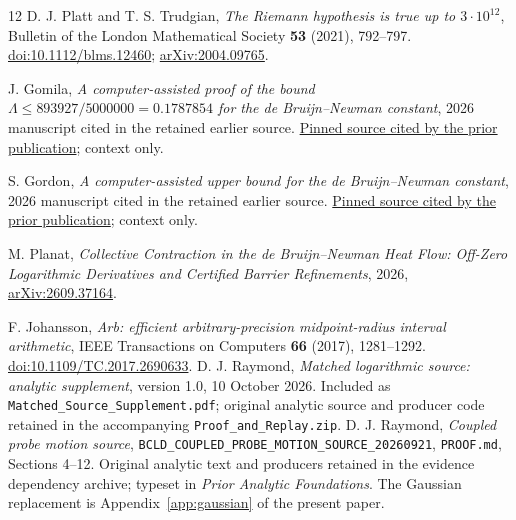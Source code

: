 \documentclass[11pt,a4paper]{article}
\theoremstyle{definition}\newtheorem{definition}[theorem]{Definition}
\theoremstyle{remark}\newtheorem{remark}[theorem]{Remark}
\begin{document}
\begin{thebibliography}{12}
 D. J. Platt and T. S. Trudgian,
\emph{The Riemann hypothesis is true up to $3\cdot10^{12}$},
Bulletin of the London Mathematical Society \textbf{53} (2021), 792--797.
\href{https://doi.org/10.1112/blms.12460}{doi:10.1112/blms.12460};
\href{https://arxiv.org/abs/2004.09765}{arXiv:2004.09765}.

 J. Gomila,
\emph{A computer-assisted proof of the bound
$\Lambda\le893927/5000000=0.1787854$ for the de Bruijn--Newman constant},
2026 manuscript cited in the retained earlier source.
\href{https://github.com/judegomila/dbn-lambda-01787854-candidate-audit/tree/a74738deb6d5e0f76887cb36901da08b68dca705}{Pinned source cited by the prior publication}; context only.

 S. Gordon,
\emph{A computer-assisted upper bound for the de Bruijn--Newman constant},
2026 manuscript cited in the retained earlier source.
\href{https://github.com/stefangordon/dbn-upper-bound/tree/64c47f2db67288beb62c24d7a0f7aedd645dc4b3}{Pinned source cited by the prior publication}; context only.

 M. Planat,
\emph{Collective Contraction in the de Bruijn--Newman Heat Flow:
Off-Zero Logarithmic Derivatives and Certified Barrier Refinements},
2026, \href{https://arxiv.org/abs/2609.37164}{arXiv:2609.37164}.

 F. Johansson,
\emph{Arb: efficient arbitrary-precision midpoint-radius interval arithmetic},
IEEE Transactions on Computers \textbf{66} (2017), 1281--1292.
\href{https://doi.org/10.1109/TC.2017.2690633}{doi:10.1109/TC.2017.2690633}.
 D. J. Raymond,
\emph{Matched logarithmic source: analytic supplement}, version 1.0,
10 October 2026. Included as \texttt{Matched\_Source\_Supplement.pdf};
original analytic source and producer code retained in the accompanying
\texttt{Proof\_and\_Replay.zip}.
 D. J. Raymond, \emph{Coupled probe motion source},
\nolinkurl{BCLD_COUPLED_PROBE_MOTION_SOURCE_20260921},
\texttt{PROOF.md}, Sections 4--12. Original analytic text and producers
retained in the evidence dependency archive; typeset in
\emph{Prior Analytic Foundations}. The Gaussian replacement is
Appendix~\ref{app:gaussian} of the present paper.
\end{thebibliography}
\end{document}
